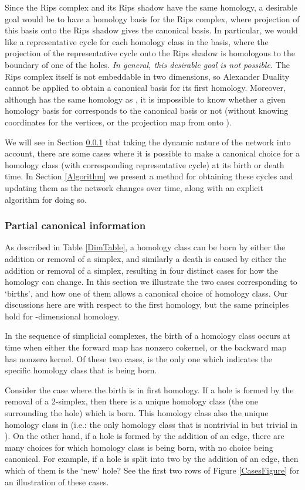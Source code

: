 \documentclass[12pt]{article}
\begin{document}
Since the Rips complex  and its Rips shadow  have the same homology, a desirable goal would be to have a homology basis for the Rips complex, where projection of this basis onto the Rips shadow gives the canonical basis. In particular, we would like a representative cycle for each homology class in the basis, where the projection of the representative cycle onto the Rips shadow is homologous to the boundary of one of the holes. \emph{In general, this desirable goal is not possible.} The Rips complex itself is not embeddable in two dimensions, so Alexander Duality cannot be applied to obtain a canonical basis for its first homology. Moreover, although  has the same homology as , it is impossible to know whether a given homology basis for  corresponds to the canonical basis or not (without knowing coordinates for the vertices, or the projection map from  onto ).

We will see in Section \ref{Partial} that taking the dynamic nature of the network into account, there are some cases where it is possible to make a canonical choice for a homology class (with corresponding representative cycle) at its birth or death time. In Section \ref{Algorithm} we present a method for obtaining these cycles and updating them as the network changes over time, along with an explicit algorithm for doing so.

\subsubsection{Partial canonical information}\label{Partial}

As described in Table \ref{DimTable}, a homology class can be born by either the addition or removal of a simplex, and similarly a death is caused by either the addition or removal of a simplex, resulting in four distinct cases for how the homology can change. In this section we illustrate the two cases corresponding to `births', and how one of them allows a canonical choice of homology class. Our discussions here are with respect to the first homology, but the same principles hold for -dimensional homology.

In the sequence of simplicial complexes, the birth of a homology class occurs at time  when either the forward map  has nonzero cokernel, or the backward map  has nonzero kernel. Of these two cases,  is the only one which indicates the specific homology class that is being born.

Consider the case where the birth is in first homology. If a hole is formed by the removal of a 2-simplex, then there is a unique homology class (the one surrounding the hole) which is born. This homology class also the unique homology class in  (i.e.: the only homology class that is nontrivial in  but trivial in ). On the other hand, if a hole is formed by the addition of an edge, there are many choices for which homology class is being born, with no choice being canonical. For example, if a hole is split into two by the addition of an edge, then which of them is the `new' hole? See the first two rows of Figure \ref{CasesFigure} for an illustration of these cases.
\end{document}

